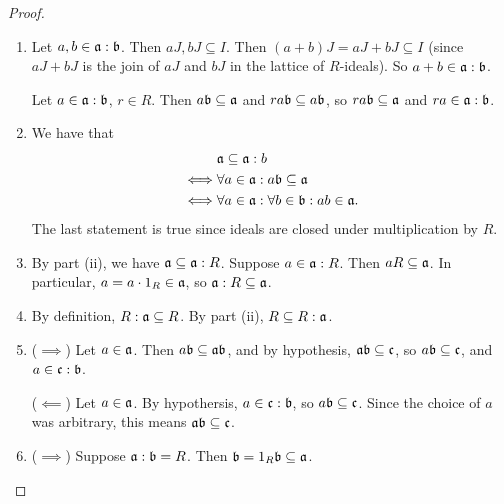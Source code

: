 \begin{proof}
  \begin{enumerate}[label=(\roman*)]
    \item Let $a, b \in \frak a : \frak b$.
          Then $aJ, bJ \subseteq I$.
          Then $(a + b)J = aJ + bJ \subseteq I$
          (since $aJ + bJ$ is the join of $aJ$ and $bJ$ in the lattice of $R$-ideals).
          So $a + b \in \frak a : \frak b$.
          
          Let $a \in \frak a : \frak b$, $r \in R$.
          Then $a \frak b \subseteq \frak a$ and $ra \frak b \subseteq a \frak b$,
          so $ra \frak b \subseteq \frak a$ and $ra \in \frak a : \frak b$.

    \item
      We have that
      \begin{align*}
             & \frak a \subseteq \frak a : b \\
        \iff & \forall a \in \frak a : a \frak b \subseteq \frak a \\
        \iff & \forall a \in \frak a : \forall b \in \frak b : ab \in \frak a.
      \end{align*}
      The last statement is true since ideals are closed under multiplication by $R$.
      
    \item
      By part (ii), we have $\frak a \subseteq \frak a : R$.
      Suppose $a \in \frak a : R$.
      Then $aR \subseteq \frak a$.
      In particular, $a = a \cdot 1_R \in \frak a$,
      so $\frak a : R \subseteq \frak a$.
      
    \item
      By definition, $R : \frak a \subseteq R$.
      By part (ii), $R \subseteq R : \frak a$.
      
    \item
      ($\implies$) Let $a \in \frak a$. Then $a \frak b \subseteq \frak a \frak b$,
      and by hypothesis, $\frak a \frak b \subseteq \frak c$,
      so $a \frak b \subseteq \frak c$,
      and $a \in \frak c : \frak b$.
      
      ($\impliedby$) Let $a \in \frak a$.
      By hypothersis, $a \in \frak c : \frak b$, so $a \frak b \subseteq \frak c$.
      Since the choice of $a$ was arbitrary, this means $\frak a \frak b \subseteq \frak c$.
      
    \item
      ($\implies$) Suppose $\frak a : \frak b = R$.
      Then $\frak b = 1_R \frak b \subseteq \frak a$.
      

\end{enumerate}
\end{proof}
